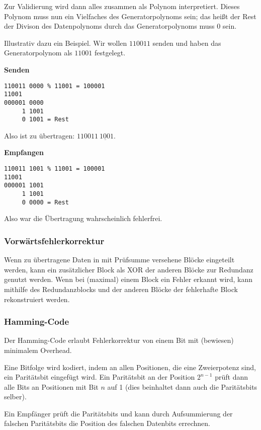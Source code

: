 \documentclass[a4paper,parskip=half*,DIV=15,fontsize=11pt]{scrartcl}
\begin{document}
Zur Validierung wird dann alles zusammen als Polynom interpretiert. Dieses Polynom muss nun ein Vielfaches des Generatorpolynoms sein; das heißt der Rest der Divison des Datenpolynoms durch das Generatorpolynoms muss 0 sein.

Illustrativ dazu ein Beispiel. Wir wollen $110011$ senden und haben das Generatorpolynom als $11001$ festgelegt.

\begin{minipage}[t]{0.5\textwidth}
\textbf{Senden}
\begin{lstlisting}
110011 0000 % 11001 = 100001
11001
000001 0000
     1 1001
     0 1001 = Rest
\end{lstlisting}
Also ist zu übertragen: $110011~\underbar{1001}$.
\end{minipage}
\begin{minipage}[t]{0.5\textwidth}
\textbf{Empfangen}
\begin{lstlisting}
110011 1001 % 11001 = 100001
11001
000001 1001
     1 1001
     0 0000 = Rest
\end{lstlisting}
Also war die Übertragung wahrscheinlich fehlerfrei.
\end{minipage}

\subsubsection{Vorwärtsfehlerkorrektur}

Wenn zu übertragene Daten in mit Prüfsumme versehene Blöcke eingeteilt werden, kann ein zusätzlicher Block als XOR der anderen Blöcke zur Redundanz genutzt werden. Wenn bei (maximal) einem Block ein Fehler erkannt wird, kann mithilfe des Redundanzblocks und der anderen Blöcke der fehlerhafte Block rekonstruiert werden.

\subsubsection{Hamming-Code}

Der Hamming-Code erlaubt Fehlerkorrektur von einem Bit mit (bewiesen) minimalem Overhead.

Eine Bitfolge wird kodiert, indem an allen Positionen, die eine Zweierpotenz sind, ein Paritätsbit eingefügt wird. Ein Paritätsbit an der Position $2^{n-1}$ prüft dann alle Bits an Positionen mit Bit $n$ auf 1 (dies beinhaltet dann auch die Paritätsbits selber).

Ein Empfänger prüft die Paritätsbits und kann durch Aufsummierung der falschen Paritätsbits die Position des falschen Datenbits errechnen.
\end{document}
